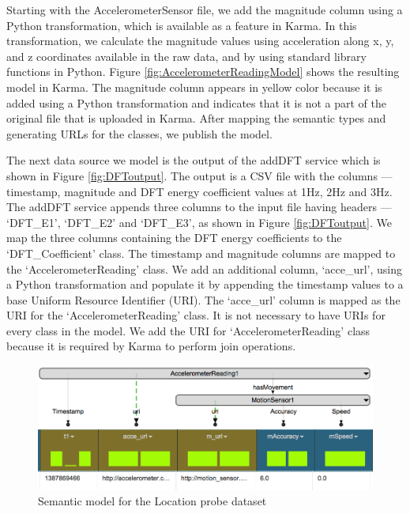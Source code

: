 Starting with the AccelerometerSensor file, we add the magnitude column using a Python transformation, which is available as a feature in Karma. In this transformation, we calculate the magnitude values using acceleration along x, y, and z coordinates available in the raw data, and by using standard library functions in Python. Figure \ref{fig:AccelerometerReadingModel} shows the resulting model in Karma. The magnitude column appears in yellow color because it is added using a Python transformation and indicates that it is not a part of the original file that is uploaded in Karma. After mapping the semantic types and generating URLs for the classes, we publish the model.

The next data source we model is the output of the addDFT service which is shown in Figure \ref{fig:DFToutput}. The output is a CSV file with the columns --- timestamp, magnitude and DFT energy coefficient values at 1Hz, 2Hz and 3Hz. The addDFT service appends three columns to the input file having headers --- `DFT\_E1', `DFT\_E2' and `DFT\_E3', as shown in Figure \ref{fig:DFToutput}. We map the three columns containing the DFT energy coefficients to the `DFT\_Coefficient' class. The timestamp and magnitude columns are mapped to the `AccelerometerReading' class. We add an additional column, `acce\_url', using a Python transformation and populate it by appending the timestamp values to a base Uniform Resource Identifier (URI). The `acce\_url' column is mapped as the URI for the `AccelerometerReading' class. It is not necessary to have URIs for every class in the model. We add the URI for `AccelerometerReading' class because it is required by Karma to perform join operations.

\begin{figure}[ht!]
\centering
\includegraphics[width=130mm]{img/motionSensorModel}
\caption{Semantic model for the Location probe dataset}
\label{fig:motionSensorModel}
\end{figure}


